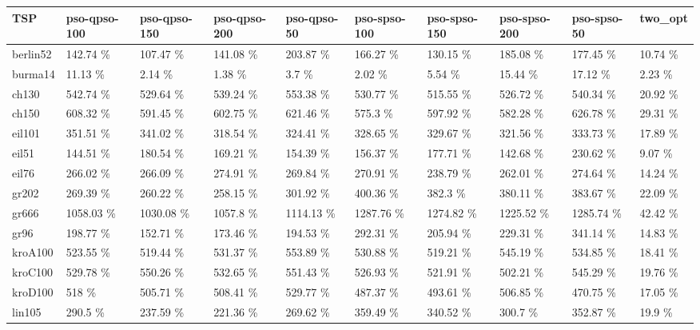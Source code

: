 \documentclass[conference]{IEEEtran}
\begin{document}
    \begin{table}[h]
	    \centering
	    \begin{adjustbox}{width=\columnwidth}
	    \begin{tabular}{ | l | l | l | l | l | l | l | l | l | l | }
	         \hline
   TSP & pso-qpso-100 & pso-qpso-150 & pso-qpso-200 & pso-qpso-50 & pso-spso-100 & pso-spso-150 & pso-spso-200 & pso-spso-50 & two\_opt \\ \hline
berlin52 & 142.74 \% & 107.47 \% & 141.08 \% & 203.87 \% & 166.27 \% & 130.15 \% & 185.08 \% & 177.45 \% & 10.74 \% \\ \hline
burma14 & 11.13 \% & 2.14 \% & 1.38 \% & 3.7 \% & 2.02 \% & 5.54 \% & 15.44 \% & 17.12 \% & 2.23 \% \\ \hline
ch130 & 542.74 \% & 529.64 \% & 539.24 \% & 553.38 \% & 530.77 \% & 515.55 \% & 526.72 \% & 540.34 \% & 20.92 \% \\ \hline
ch150 & 608.32 \% & 591.45 \% & 602.75 \% & 621.46 \% & 575.3 \% & 597.92 \% & 582.28 \% & 626.78 \% & 29.31 \% \\ \hline
eil101 & 351.51 \% & 341.02 \% & 318.54 \% & 324.41 \% & 328.65 \% & 329.67 \% & 321.56 \% & 333.73 \% & 17.89 \% \\ \hline
eil51 & 144.51 \% & 180.54 \% & 169.21 \% & 154.39 \% & 156.37 \% & 177.71 \% & 142.68 \% & 230.62 \% & 9.07 \% \\ \hline
eil76 & 266.02 \% & 266.09 \% & 274.91 \% & 269.84 \% & 270.91 \% & 238.79 \% & 262.01 \% & 274.64 \% & 14.24 \% \\ \hline
gr202 & 269.39 \% & 260.22 \% & 258.15 \% & 301.92 \% & 400.36 \% & 382.3 \% & 380.11 \% & 383.67 \% & 22.09 \% \\ \hline
gr666 & 1058.03 \% & 1030.08 \% & 1057.8 \% & 1114.13 \% & 1287.76 \% & 1274.82 \% & 1225.52 \% & 1285.74 \% & 42.42 \% \\ \hline
gr96 & 198.77 \% & 152.71 \% & 173.46 \% & 194.53 \% & 292.31 \% & 205.94 \% & 229.31 \% & 341.14 \% & 14.83 \% \\ \hline
kroA100 & 523.55 \% & 519.44 \% & 531.37 \% & 553.89 \% & 530.88 \% & 519.21 \% & 545.19 \% & 534.85 \% & 18.41 \% \\ \hline
kroC100 & 529.78 \% & 550.26 \% & 532.65 \% & 551.43 \% & 526.93 \% & 521.91 \% & 502.21 \% & 545.29 \% & 19.76 \% \\ \hline
kroD100 & 518 \% & 505.71 \% & 508.41 \% & 529.77 \% & 487.37 \% & 493.61 \% & 506.85 \% & 470.75 \% & 17.05 \% \\ \hline
lin105 & 290.5 \% & 237.59 \% & 221.36 \% & 269.62 \% & 359.49 \% & 340.52 \% & 300.7 \% & 352.87 \% & 19.9 \% \\ \hline

\end{tabular}
\end{adjustbox}
\end{table}
\end{document}
